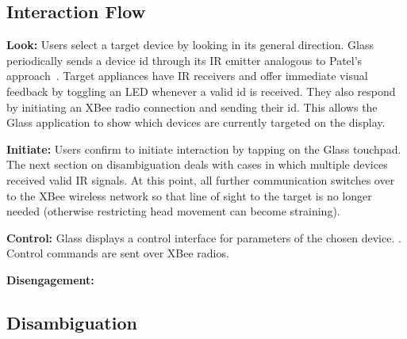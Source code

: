\subsection{Interaction Flow}
{\bf Look:} Users select a target device by looking in its general direction.
Glass periodically sends a device id through its IR emitter analogous to Patel's approach~\cite{patel_2-way_2003}. Target appliances have IR receivers and offer immediate visual feedback by toggling an LED whenever a valid id is received. They also respond by initiating an XBee radio connection and sending their id. This allows the Glass application to show which devices are currently targeted on the display. 

{\bf Initiate:} Users confirm to initiate interaction by tapping on the Glass touchpad. The next section on disambiguation deals with cases in which multiple devices received valid IR signals. At this point, all further communication switches over to the XBee wireless network so that line of sight to the target is no longer needed (otherwise restricting head movement can become straining).

{\bf Control:} Glass displays a control interface for parameters of the chosen device. .
Control commands are sent over XBee radios.

{\bf Disengagement:}  

\subsection{Disambiguation}

